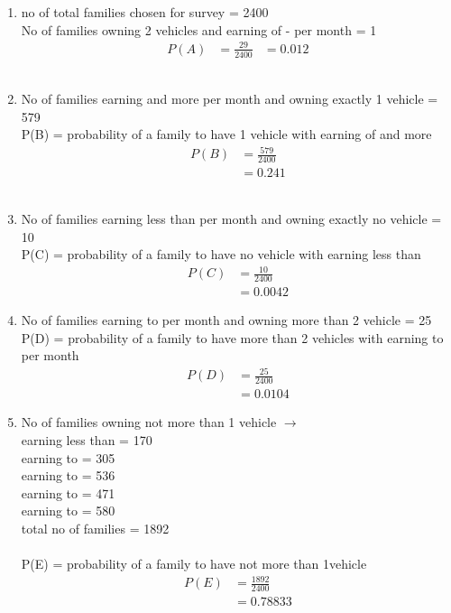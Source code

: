\renewcommand{\theequation}{\theenumi}
\begin{enumerate}[label=\arabic*.,ref=\thesubsection.\theenumi]
\item no of total families chosen for survey = 2400
\\
No of families owning 2 vehicles and earning of  -  per month = 1
\begin{align}
P\left(A\right) &= \frac{29}{2400}
&= 0.012
\end{align}
\\
\item No of families earning  and more per month and owning exactly 1 vehicle = 579
\\
P(B) = probability of a family to have 1 vehicle with earning of  and more 
\begin{align}
P\left(B\right) &= \frac{579}{2400}
\\
&= 0.241
\end{align}
\\
\item No of families earning  less than   per month and owning exactly no vehicle = 10
\\
P(C) = probability of a family to have no vehicle with earning less than   
\begin{align}
P\left(C\right) &= \frac{10}{2400}
\\
&= 0.0042
\end{align}
\item No of families earning     to   per month and owning more than 2 vehicle = 25
\\
P(D) = probability of a family to have more than 2 vehicles with earning  to  per month   
\begin{align}
P\left(D\right) &= \frac{25}{2400}
\\
&= 0.0104
\end{align}
\item No of families owning not  more than 1 vehicle $\to$
\\
earning less than  = 170
\\
earning  to  = 305
\\
earning  to  = 536
\\
earning  to  = 471
\\
earning  to  = 580
\\
total no of families  = 1892
\\
\\
P(E) = probability of a family to have not more than 1vehicle    
\begin{align}
P\left(E\right) &= \frac{1892}{2400}
\\
&= 0.78833
\end{align}
\end{enumerate}